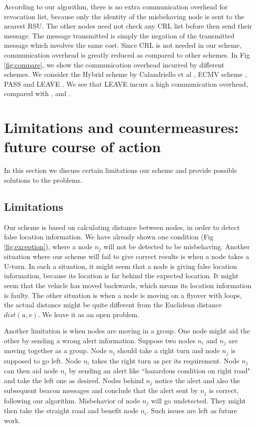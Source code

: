 \documentclass[conference]{IEEEtran}[10pt]
\begin{document}
According to our algorithm, there is no extra communication overhead for revocation list, because only the 
identity of the misbehaving node is sent to the nearest RSU. 
The other nodes need not check any CRL list before then send their message. 
The message transmitted is simply the negation of the transmitted message which involves the same cost. 
Since CRL is not needed in our scheme, communication overhead is greatly reduced as compared to other schemes. 
In Fig \ref{fig:compare}, we show the communication overhead incurred by different schemes. 
We consider the Hybrid scheme by Calandriello et al \cite{CPHL07}, ECMV scheme \cite{WJS08}, PASS \cite{SLLSS10} and LEAVE \cite{RPAJH07}. 
We see that LEAVE incurs a high communication overhead, compared with \cite{CPHL07}, \cite{WJS08} and \cite{SLLSS10}. 

\section{Limitations and countermeasures: future course of action}
\label{sec:limitations}
In this section we discuss certain limitations our scheme and provide possible solutions to the problems.
\subsection{Limitations}
Our scheme is based on calculating distance between nodes, in order to detect false location information. 
We have already shown one condition (Fig \ref{fig:exception}), where a node $n_j$ will not be detected to be misbehaving.
Another situation where our scheme will fail to give correct results is when a node takes a U-turn. 
In such a situation, it might seem that a node is giving false location information, 
because its location is far behind the expected location.
It might seem that the vehicle has moved backwards, which means its location information is faulty.  
The other situation is when a node is moving on a flyover with loops, 
the actual distance might be quite different from the Euclidean distance $dist(u,v)$. 
We leave it as an open problem. 


Another limitation is when nodes are moving in a group. 
One node might aid the other by sending a wrong alert information. 
Suppose two nodes $n_i$ and $n_j$ are moving together as a group. 
Node $n_i$ should take a right turn and node $n_j$ is supposed to go left. 
Node $n_i$ takes the right turn as per its requirement. 
Node $n_j$ can then aid node $n_i$ by sending an alert like ``hazardous condition on right road" and take the left one as desired. 
Nodes behind $n_j$ notice the alert and also the subsequent beacon messages and conclude that the alert sent by $n_j$ is correct, following our algorithm. 
Misbehavior of node $n_j$ will go undetected. 
They might then take the straight road and benefit node $n_i$. 
Such issues are left as future work. 
\end{document}
